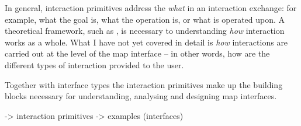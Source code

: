 

In general, interaction primitives
address the \textit{what} in an interaction exchange:
for example, what the goal is, what the operation is, or what is operated upon.
A theoretical framework, such as \textcite{rot2011, rot2012, nor1988},
is necessary to understanding \textit{how} interaction works as a whole.
What I have not yet covered in detail is
\textit{how} interactions are carried out at the level of the map interface --
in other words, how are the different types of interaction provided to the user.

Together with interface types the interaction primitives make up
the building blocks necessary for understanding, analysing and designing map interfaces.







-> interaction primitives -> examples (interfaces)










